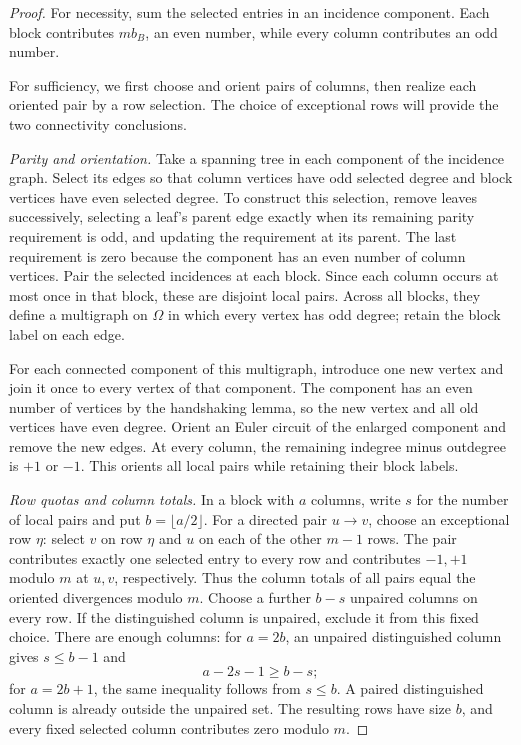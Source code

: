 \documentclass[11pt,reqno]{amsart}
\numberwithin{equation}{section}
\theoremstyle{definition}
\theoremstyle{remark}
\newcommand{\cO}{\Omega}
\begin{document}
\begin{proof}
For necessity, sum the selected entries in an incidence component. Each block
contributes $mb_B$, an even number, while every column contributes an odd number.

For sufficiency, we first choose and orient pairs of columns, then realize
each oriented pair by a row selection. The choice of exceptional rows will
provide the two connectivity conclusions.

\emph{Parity and orientation.}
Take a spanning tree in each component of the incidence graph. Select its
edges so that column vertices have odd selected degree and block vertices
have even selected degree. To construct this selection, remove leaves
successively, selecting a leaf's parent edge exactly when its remaining
parity requirement is odd, and updating the requirement at its parent.
The last requirement is zero because the component has an even number of
column vertices.
Pair the selected incidences at each block. Since each column occurs at most
once in that block, these are disjoint local pairs. Across all blocks, they
define a multigraph on $\cO$ in which every vertex has odd degree; retain the
block label on each edge.

For each connected component of this multigraph, introduce one new vertex
and join it once to every vertex of that component. The component has an
even number of vertices by the handshaking lemma, so the new vertex and all
old vertices have even degree. Orient an Euler circuit of the enlarged
component and remove the new edges. At every column, the remaining indegree
minus outdegree is $+1$ or $-1$. This orients all local pairs while retaining
their block labels.

\emph{Row quotas and column totals.}
In a block with $a$ columns, write $s$ for the number of local pairs and put
$b=\lfloor a/2\rfloor$. For a directed pair $u\to v$, choose an exceptional
row $\eta$: select $v$ on row $\eta$ and $u$ on each of the other $m-1$ rows.
The pair contributes exactly one selected entry to every row and contributes
$-1,+1$ modulo $m$ at $u,v$, respectively. Thus the column totals of all
pairs equal the oriented divergences modulo $m$.
Choose a further $b-s$ unpaired columns on every row. If the distinguished
column is unpaired, exclude it from this fixed choice. There are enough
columns: for $a=2b$, an unpaired distinguished column gives $s\le b-1$ and
\[
 a-2s-1\ge b-s;
\]
for $a=2b+1$, the same inequality follows from $s\le b$. A paired
distinguished column is already outside the unpaired set. The resulting
rows have size $b$, and every fixed selected column contributes zero modulo
$m$.


\end{proof}
\end{document}
